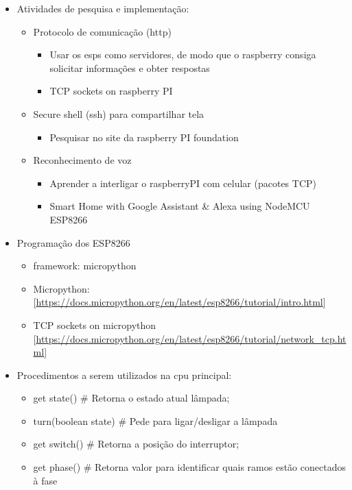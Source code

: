 \documentclass[11pt]{article}
\begin{document}
\begin{itemize}
\item Atividades de pesquisa e implementação:
\begin{itemize}
\item Protocolo de comunicação (http)
\begin{itemize}
\item Usar os esps como servidores, de modo que o raspberry consiga solicitar informações e obter respostas
\item TCP sockets on raspberry PI
\end{itemize}
\item Secure shell (ssh) para compartilhar tela
\begin{itemize}
\item Pesquisar no site da raspberry PI foundation
\end{itemize}
\item Reconhecimento de voz
\begin{itemize}
\item Aprender a interligar o raspberryPI com celular (pacotes TCP)
\item Smart Home with Google Assistant \& Alexa using NodeMCU ESP8266
\end{itemize}
\end{itemize}
\item Programação dos ESP8266
\begin{itemize}
\item framework: micropython
\item Micropython: [\url{https://docs.micropython.org/en/latest/esp8266/tutorial/intro.html}]
\item TCP sockets on micropython [\url{https://docs.micropython.org/en/latest/esp8266/tutorial/network\_tcp.html}]
\end{itemize}
\item Procedimentos a serem utilizados na cpu principal:
\begin{itemize}
\item get state() \# Retorna o estado atual lâmpada;
\item turn(boolean state) \# Pede para ligar/desligar a lâmpada
\item get switch() \# Retorna a posição do interruptor;
\item get phase() \# Retorna valor para identificar quais ramos estão conectados à fase
\end{itemize}
\end{itemize}
\end{document}
